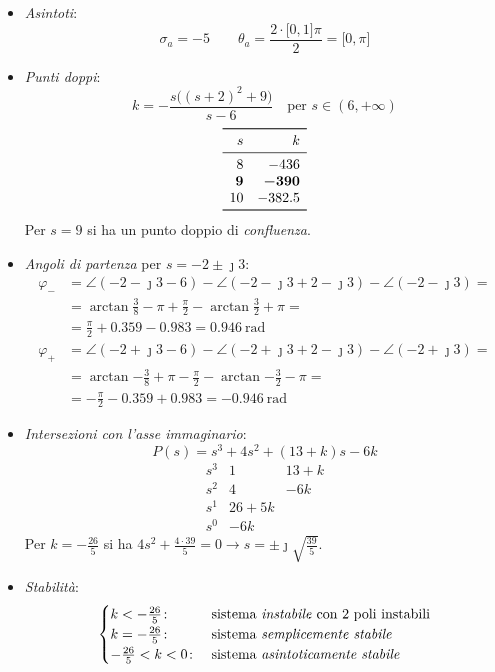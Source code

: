 \begin{itemize}
	\item \emph{Asintoti}:
		\[
			\sigma_a = -5 \qquad
			\theta_a = \frac{2\cdot\bigl[0,1\bigr]\pi}{2} = \bigl[0,\pi\bigr]
		\]
	\item \emph{Punti doppi}:
		\[
			k = -\frac{s\bigl((s+2)^2+9\bigr)}{s-6} \quad
			\text{per } s \in (6,+\infty)
		\]
		\[\begin{array}{rr}
			\toprule
			     s &         k \\
			\midrule
			     8 &      -436 \\
			\bm{9} & \bm{-390} \\
			    10 &      -382.5 \\
			\bottomrule
		\end{array}\]
		Per \(s=9\) si ha un punto doppio di \emph{confluenza}.
	\item \emph{Angoli di partenza} per \(s=-2\pm\jmath3\):
		\begin{align*}
			\varphi_- &= \angle(-2-\jmath3-6) -\angle(-2-\jmath3+2-\jmath3) -\angle(-2-\jmath3) = \\
				  &= \arctan{\frac{3}{8}} -\pi +\frac{\pi}{2} -\arctan{\frac{3}{2}} +\pi = \\
				  &= \frac{\pi}{2} +0.359 -0.983 = \SI{0.946}{\radian} \\
			\varphi_+ &= \angle(-2+\jmath3-6) -\angle(-2+\jmath3+2-\jmath3) -\angle(-2+\jmath3) = \\
				  &= \arctan{-\frac{3}{8}} +\pi -\frac{\pi}{2} -\arctan{-\frac{3}{2}} -\pi = \\
				  &= -\frac{\pi}{2} -0.359 +0.983 = \SI{-0.946}{\radian}
		\end{align*}
	\item \emph{Intersezioni con l'asse immaginario}:
		\[
			P(s) = s^3 +4s^2 +(13+k)s -6k
		\]
		\[\begin{array}{r|rr}
			s^3 & 1 & 13+k \\
			s^2 & 4 & -6k  \\
			s^1 & 26+5k    \\
			s^0 & -6k
		\end{array}\]
		Per \(k = -\frac{26}{5}\) si ha \(4s^2+\frac{4\cdot39}{5}=0 \rightarrow s=\pm\jmath\sqrt{\frac{39}{5}}\).
	\item \emph{Stabilità}:
		\[\begin{cases}
			k < -\frac{26}{5}\colon & \text{sistema \emph{instabile} con 2 poli instabili} \\
			k = -\frac{26}{5}\colon & \text{sistema \emph{semplicemente stabile}} \\
			-\frac{26}{5} < k < 0\colon & \text{sistema \emph{asintoticamente stabile}}
		\end{cases}\]
\end{itemize}

